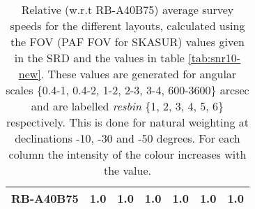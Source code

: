 \begin{table}[!htp]
{{\begin{tabular}{|lcccccc|}
RB-A40B75 & 1.0 \cellcolor{blue!28.88} & 1.0 \cellcolor{red!39.17} & 1.0 \cellcolor{green!60.00} & 1.0 \cellcolor{orange!60.00} & 1.0 \cellcolor{purple!60.00} & 1.0 \cellcolor{blue!21.08}\tabularnewline \hline 
\end{tabular}}\hfill \\
\hfill \\

\caption{Relative (w.r.t RB-A40B75) average survey speeds for the different layouts, calculated using the FOV (PAF FOV for SKASUR) values given in the SRD \cite{srd} and the values in table \ref{tab:snr10-new}. These values are generated for angular scales \{0.4-1, 0.4-2, 1-2, 2-3, 3-4, 600-3600\} arcsec and are labelled {\it resbin} \{1, 2, 3, 4, 5, 6\} respectively. This is done for natural weighting at declinations -10, -30 and -50 degrees. For each column the intensity of the colour increases with the value.}\label{tab:speed_avg-new}}
 \end{table}